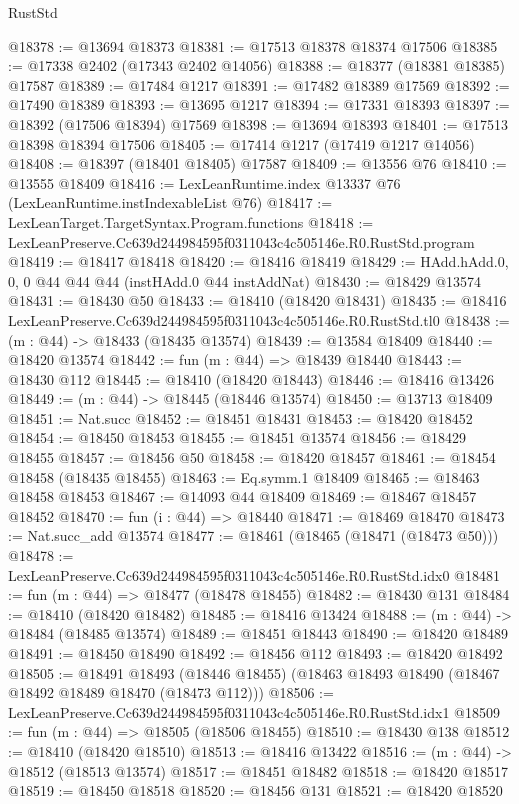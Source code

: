 \begin{lexlean}{RustStd}
\begin{coremodule}
@18378 := @13694 @18373
@18381 := @17513 @18378 @18374 @17506
@18385 := @17338 @2402 (@17343 @2402 @14056)
@18388 := @18377 (@18381 @18385) @17587
@18389 := @17484 @1217
@18391 := @17482 @18389 @17569
@18392 := @17490 @18389
@18393 := @13695 @1217
@18394 := @17331 @18393
@18397 := @18392 (@17506 @18394) @17569
@18398 := @13694 @18393
@18401 := @17513 @18398 @18394 @17506
@18405 := @17414 @1217 (@17419 @1217 @14056)
@18408 := @18397 (@18401 @18405) @17587
@18409 := @13556 @76
@18410 := @13555 @18409
@18416 := LexLeanRuntime.index @13337 @76 (LexLeanRuntime.instIndexableList @76)
@18417 := LexLeanTarget.TargetSyntax.Program.functions
@18418 := LexLeanPreserve.Cc639d244984595f0311043c4c505146e.R0.RustStd.program
@18419 := @18417 @18418
@18420 := @18416 @18419
@18429 := HAdd.hAdd.{0, 0, 0} @44 @44 @44 (instHAdd.{0} @44 instAddNat)
@18430 := @18429 @13574
@18431 := @18430 @50
@18433 := @18410 (@18420 @18431)
@18435 := @18416 LexLeanPreserve.Cc639d244984595f0311043c4c505146e.R0.RustStd.tl0
@18438 := (m : @44) -> @18433 (@18435 @13574)
@18439 := @13584 @18409
@18440 := @18420 @13574
@18442 := fun (m : @44) => @18439 @18440
@18443 := @18430 @112
@18445 := @18410 (@18420 @18443)
@18446 := @18416 @13426
@18449 := (m : @44) -> @18445 (@18446 @13574)
@18450 := @13713 @18409
@18451 := Nat.succ
@18452 := @18451 @18431
@18453 := @18420 @18452
@18454 := @18450 @18453
@18455 := @18451 @13574
@18456 := @18429 @18455
@18457 := @18456 @50
@18458 := @18420 @18457
@18461 := @18454 @18458 (@18435 @18455)
@18463 := Eq.symm.{1} @18409
@18465 := @18463 @18458 @18453
@18467 := @14093 @44 @18409
@18469 := @18467 @18457 @18452
@18470 := fun (i : @44) => @18440
@18471 := @18469 @18470
@18473 := Nat.succ_add @13574
@18477 := @18461 (@18465 (@18471 (@18473 @50)))
@18478 := LexLeanPreserve.Cc639d244984595f0311043c4c505146e.R0.RustStd.idx0
@18481 := fun (m : @44) => @18477 (@18478 @18455)
@18482 := @18430 @131
@18484 := @18410 (@18420 @18482)
@18485 := @18416 @13424
@18488 := (m : @44) -> @18484 (@18485 @13574)
@18489 := @18451 @18443
@18490 := @18420 @18489
@18491 := @18450 @18490
@18492 := @18456 @112
@18493 := @18420 @18492
@18505 := @18491
    @18493
    (@18446 @18455)
    (@18463 @18493 @18490 (@18467 @18492 @18489 @18470 (@18473 @112)))
@18506 := LexLeanPreserve.Cc639d244984595f0311043c4c505146e.R0.RustStd.idx1
@18509 := fun (m : @44) => @18505 (@18506 @18455)
@18510 := @18430 @138
@18512 := @18410 (@18420 @18510)
@18513 := @18416 @13422
@18516 := (m : @44) -> @18512 (@18513 @13574)
@18517 := @18451 @18482
@18518 := @18420 @18517
@18519 := @18450 @18518
@18520 := @18456 @131
@18521 := @18420 @18520

\end{coremodule}
\end{lexlean}
